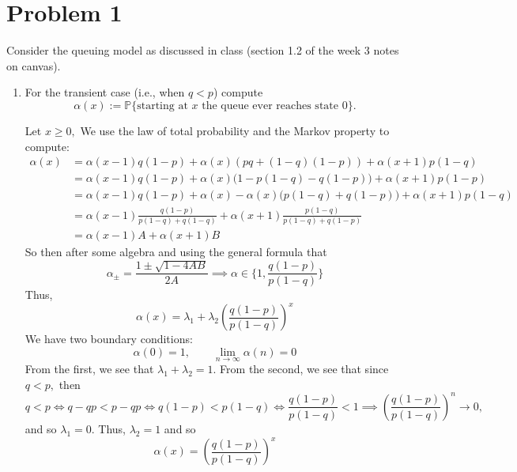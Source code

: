 \documentclass[11pt]{article}
\begin{document}
	
	
	\psetheader

\section*{Problem 1}
Consider the queuing model as discussed in class (section 1.2 of the week 3 notes on canvas).

\begin{enumerate}[label=(\alph*)]
    \item For the transient case (i.e., when \(q<p\)) compute
    \[
    \alpha(x):=\mathbb{P}\{\text{starting at $x$ the queue ever reaches state 0}\}.
    \]
\begin{solution}
    Let $x \geq 0,$ We use the law of total probability and the Markov property to compute:
\begin{align*}
    \alpha(x) &= \alpha(x-1) q(1-p) + \alpha(x)(pq + (1-q)(1-p)) + \alpha(x + 1)p(1-q)\\
    &= \alpha(x-1) q(1-p) + \alpha(x)\big(1 - p(1-q) - q(1-p)\big) + \alpha(x + 1)p(1-p)\\
    &= \alpha(x-1) q(1-p) + \alpha(x) - \alpha(x)\big(p(1-q) + q(1-p)\big) + \alpha(x + 1)p(1-q)\\
    &= \alpha(x-1) \frac{q(1-p)}{p(1-q) + q(1-q)} + \alpha(x + 1) \frac{p(1-q)}{p(1-q) + q(1-p)}\\
    &= \alpha(x-1)A + \alpha(x+1)B
\end{align*}
So then after some algebra and using the general formula that 
\[\alpha_{\pm} = \frac{1 \pm \sqrt{1 - 4AB}}{2A} \implies \alpha \in \{1, \frac{q(1-p)}{p(1-q)}\}\] Thus, 
\[\alpha(x) = \lambda_1  + \lambda_2\left(\frac{q(1-p)}{p(1-q)}\right)^x\]
We have two boundary conditions:
\[\alpha(0) = 1, \qquad \lim_{n \to \infty}\alpha(n) = 0\] From the first, we see that $\lambda_1 + \lambda_2 = 1.$ From the second, we see that since $q<p,$ then 
\[q< p \iff q - qp < p - qp \iff q(1-p) < p(1-q) \iff \frac{q(1-p)}{p(1-q)} <1 \implies \left(\frac{q(1-p)}{p(1-q)}\right)^n \to0,\] and so $\lambda_1 = 0.$ Thus, $\lambda_2 = 1$ and so 
\[\boxed{\alpha(x) = \left(\frac{q(1-p)}{p(1-q)}\right)^x}\]
\end{solution}
    

\end{enumerate}
\end{document}
